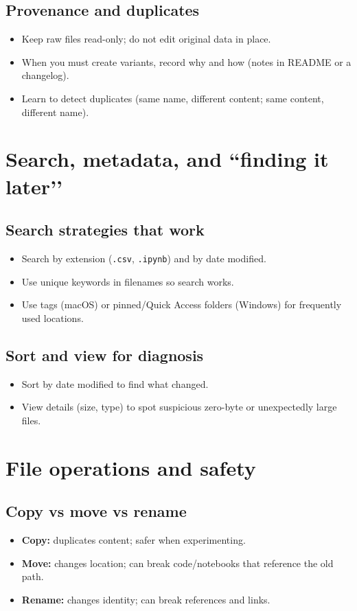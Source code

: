 \subsection{Provenance and duplicates}
\begin{itemize}
\item Keep raw files read-only; do not edit original data in place.
\item When you must create variants, record why and how (notes in README or a changelog).
\item Learn to detect duplicates (same name, different content; same content, different name).
\end{itemize}

\section{Search, metadata, and ``finding it later’’}
\subsection{Search strategies that work}
\begin{itemize}
\item Search by extension (\texttt{.csv}, \texttt{.ipynb}) and by date modified.
\item Use unique keywords in filenames so search works.
\item Use tags (macOS) or pinned/Quick Access folders (Windows) for frequently used locations.
\end{itemize}

\subsection{Sort and view for diagnosis}
\begin{itemize}
\item Sort by date modified to find what changed.
\item View details (size, type) to spot suspicious zero-byte or unexpectedly large files.
\end{itemize}

\section{File operations and safety}
\subsection{Copy vs move vs rename}
\begin{itemize}
\item \textbf{Copy:} duplicates content; safer when experimenting.
\item \textbf{Move:} changes location; can break code/notebooks that reference the old path.
\item \textbf{Rename:} changes identity; can break references and links.
\end{itemize}

